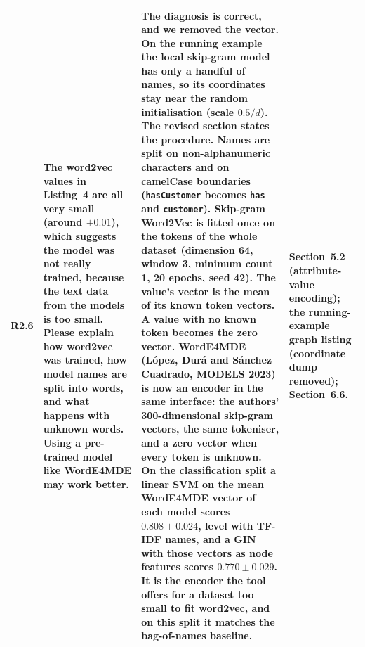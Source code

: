 \documentclass[11pt,a4paper]{article}
\begin{document}
\begin{longtable}{@{}P{1.0cm}P{4.3cm}P{5.9cm}P{3.9cm}@{}}
R2.6 &
The word2vec values in Listing~4 are all very small (around $\pm 0.01$), which suggests the model was not really trained, because the text data from the models is too small. Please explain how word2vec was trained, how model names are split into words, and what happens with unknown words. Using a pre-trained model like WordE4MDE may work better. &
The diagnosis is correct, and we removed the vector. On the running example the local skip-gram model has only a handful of names, so its coordinates stay near the random initialisation (scale \(0.5/d\)).
The revised section states the procedure. Names are split on non-alphanumeric characters and on camelCase boundaries (\texttt{hasCustomer} becomes \texttt{has} and \texttt{customer}). Skip-gram Word2Vec is fitted once on the tokens of the whole dataset (dimension 64, window 3, minimum count 1, 20 epochs, seed 42). The value's vector is the mean of its known token vectors. A value with no known token becomes the zero vector.
WordE4MDE (L\'opez, Dur\'a and S\'anchez Cuadrado, MODELS 2023) is now an encoder in the same interface: the authors' 300-dimensional skip-gram vectors, the same tokeniser, and a zero vector when every token is unknown. On the classification split a linear SVM on the mean WordE4MDE vector of each model scores \(0.808\pm0.024\), level with TF-IDF names, and a GIN with those vectors as node features scores \(0.770\pm0.029\). It is the encoder the tool offers for a dataset too small to fit word2vec, and on this split it matches the bag-of-names baseline. &
Section~5.2 (attribute-value encoding); the running-example graph listing (coordinate dump removed); Section~6.6. \\
\midrule


\end{longtable}
\end{document}
